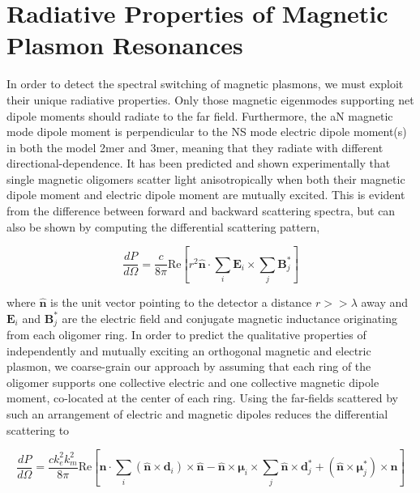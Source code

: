 \documentclass[journal=apchd5,manuscript=article]{achemso}
\begin{document}
\section{Radiative Properties of Magnetic Plasmon Resonances}
In order to detect the spectral switching of magnetic plasmons, we must exploit their unique radiative properties. Only those magnetic eigenmodes supporting net dipole moments should radiate to the far field. Furthermore, the aN magnetic mode dipole moment is perpendicular to the NS mode electric dipole moment(s) in both the model 2mer and 3mer, meaning that they radiate with different directional-dependence. It has been predicted and shown experimentally that single magnetic oligomers scatter light anisotropically when both their magnetic dipole moment and electric dipole moment are mutually excited.\cite{Dionne2011,Cherqui2016} This is evident from the difference between forward and backward scattering spectra, but can also be shown by computing the differential scattering pattern,\cite{jackson_classical_1999,schwinger1998classical}

\begin{equation}
\frac{dP}{d\Omega} = \frac{c}{8\pi}\textrm{Re}\left[r^2\hat{\textbf{n}}\cdot\sum_i\textbf{E}_i \times \sum_{j}\textbf{B}_{j}^*\right]
\label{dp_field_1}
\end{equation}

\noindent where $\hat{\textbf{n}}$ is the unit vector pointing to the detector a distance $r >> \lambda$ away and $\textbf{E}_i$ and $\textbf{B}_j^*$ are the electric field and conjugate magnetic inductance originating from each oligomer ring. In order to predict the qualitative properties of independently and mutually exciting an orthogonal magnetic and electric plasmon, we coarse-grain our approach by assuming that each ring of the oligomer supports one collective electric and one collective magnetic dipole moment, co-located at the center of each ring. Using the far-fields scattered by such an arrangement of electric and magnetic dipoles reduces the differential scattering to\cite{Alu2006}

\begin{equation}
\frac{dP}{d\Omega} = \frac{ck_e^2k_m^2}{8\pi} \textrm{Re} \left[\hat{\textbf{n}} \cdot \sum_{i} (\hat{\textbf{n}} \times \textbf{d}_i) \times \hat{\textbf{n}} - \hat{\textbf{n}} \times \boldsymbol{\mu}_i \times \sum_{j} \hat{\textbf{n}} \times \textbf{d}_j^* + (\hat{\textbf{n}} \times \boldsymbol{\mu}_j^*) \times \hat{\textbf{n}}\right]
\label{dp_coarse_grain}
\end{equation}
\end{document}
